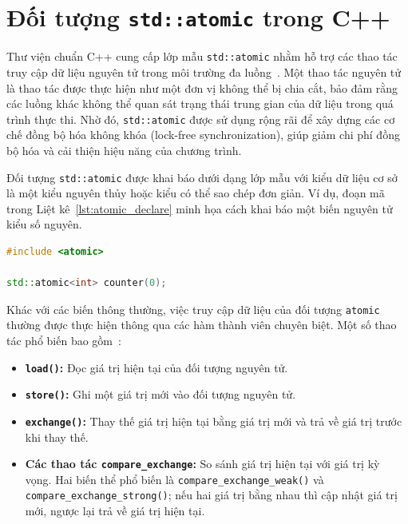 \section{Đối tượng \texttt{std::atomic} trong C++}

Thư viện chuẩn C++ cung cấp lớp mẫu \texttt{std::atomic} nhằm hỗ trợ các thao tác truy cập dữ liệu nguyên tử trong môi trường đa luồng~\cite{cppreference_atomic, williams2019cppconcurrency}. Một thao tác nguyên tử là thao tác được thực hiện như một đơn vị không thể bị chia cắt, bảo đảm rằng các luồng khác không thể quan sát trạng thái trung gian của dữ liệu trong quá trình thực thi. Nhờ đó, \texttt{std::atomic} được sử dụng rộng rãi để xây dựng các cơ chế đồng bộ hóa không khóa (lock-free synchronization), giúp giảm chi phí đồng bộ hóa và cải thiện hiệu năng của chương trình.

Đối tượng \texttt{std::atomic} được khai báo dưới dạng lớp mẫu với kiểu dữ liệu cơ sở là một kiểu nguyên thủy hoặc kiểu có thể sao chép đơn giản. Ví dụ, đoạn mã trong Liệt kê~\ref{lst:atomic_declare} minh họa cách khai báo một biến nguyên tử kiểu số nguyên.

\begin{lstlisting}[language=C++,caption={Khai báo đối tượng atomic},label={lst:atomic_declare}]
#include <atomic>

std::atomic<int> counter(0);
\end{lstlisting}

Khác với các biến thông thường, việc truy cập dữ liệu của đối tượng \texttt{atomic} thường được thực hiện thông qua các hàm thành viên chuyên biệt. Một số thao tác phổ biến bao gồm~\cite{cppreference_atomic}:

\begin{itemize}
\item \textbf{\texttt{load()}:} Đọc giá trị hiện tại của đối tượng nguyên tử.

\item \textbf{\texttt{store()}:} Ghi một giá trị mới vào đối tượng nguyên tử.

\item \textbf{\texttt{exchange()}:} Thay thế giá trị hiện tại bằng giá trị mới và trả về giá trị trước khi thay thế.

\item \textbf{Các thao tác \texttt{compare\_exchange}:} So sánh giá trị hiện tại với giá trị kỳ vọng. Hai biến thể phổ biến là \nolinkurl{compare_exchange_weak()} và \nolinkurl{compare_exchange_strong()}; nếu hai giá trị bằng nhau thì cập nhật giá trị mới, ngược lại trả về giá trị hiện tại.
\end{itemize}

